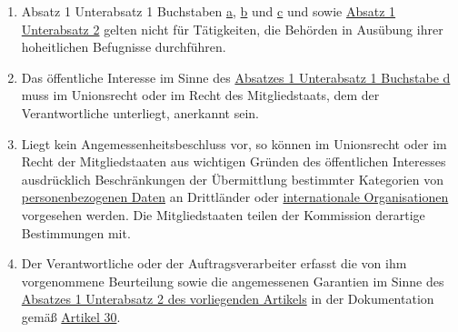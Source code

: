\begin{enumerate}
  \item Absatz 1 Unterabsatz 1 Buchstaben \hyperref[itm:49-1-1a]{a}, \hyperref[itm:49-1-1b]{b} und \hyperref
   [itm:49-1-1c]{c} und sowie \hyperref[itm:49-1-2]{Absatz 1 Unterabsatz 2} gelten nicht für Tätigkeiten, die Behörden
   in Ausübung ihrer hoheitlichen Befugnisse durchführen.
  \label{itm:49-3}

  \item Das öffentliche Interesse im Sinne des \hyperref[itm:49-1-1d]{Absatzes 1 Unterabsatz 1 Buchstabe d} muss im
   Unionsrecht oder im Recht des Mitgliedstaats, dem der Verantwortliche unterliegt, anerkannt sein.
  \label{itm:49-4}

  \item Liegt kein Angemessenheitsbeschluss vor, so können im Unionsrecht oder im Recht der Mitgliedstaaten aus
   wichtigen Gründen des öffentlichen Interesses ausdrücklich Beschränkungen der Übermittlung bestimmter Kategorien von
   \hyperref[itm:04-1]{personenbezogenen Daten} an Drittländer oder \hyperref[itm:04-29]{internationale Organisationen} vorgesehen werden. Die Mitgliedstaaten
   teilen der Kommission derartige Bestimmungen mit.
  \label{itm:49-5}

  \item Der Verantwortliche oder der Auftragsverarbeiter erfasst die von ihm vorgenommene Beurteilung sowie die
   angemessenen Garantien im Sinne des \hyperref[itm:49-1-2]{Absatzes 1 Unterabsatz 2 des vorliegenden Artikels} in der
   Dokumentation gemäß \hyperref[ch:30]{Artikel 30}.
  \label{itm:49-6}

\end{enumerate}


